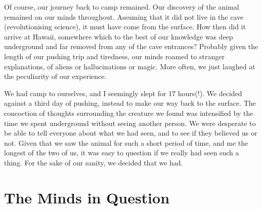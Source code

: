 
Of course, our journey back to camp remained. Our discovery of the animal remained on our minds throughout. Assuming that it did not live in the cave (revolutionising science), it must have come from the surface. How then did it arrive at Hawaii, somewhere which to the best of our knowledge was deep underground and far removed from any of the cave entrances? Probably given the length of our pushing trip and tiredness, our minds roamed to stranger explanations, of aliens or hallucinations or magic. More often, we just laughed at the peculiarity of our experience. 

We had camp to ourselves, and I seemingly slept for 17 hours(!). We decided against a third day of pushing, instead to make our way back to the surface. The concoction of thoughts surrounding the creature we found was intensified by the time we spent underground without seeing another person. We were desperate to be able to tell everyone about what we had seen, and to see if they believed us or not. Given that we saw the animal for such a short period of time, and me the longest of the two of us, it was easy to question if we really had seen such a thing. For the sake of our sanity, we decided that we had. 


\section{The Minds in Question}

